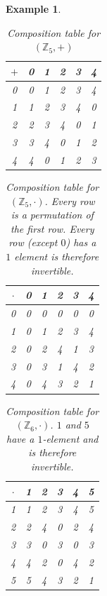 \documentclass[a4paper,landscape,twocolumn]{article}
\newtheorem{ex}{Example}[section]
\begin{document}
\begin{ex}
  \begin{table}[!ht]
    \begin{center}
      \begin{tabular}{c|ccccc}
        $+$ & 0 & 1 & 2 & 3 & 4 \\
      \hline
          0 & 0 & 1 & 2 & 3 & 4 \\
          1 & 1 & 2 & 3 & 4 & 0 \\
          2 & 2 & 3 & 4 & 0 & 1 \\
          3 & 3 & 4 & 0 & 1 & 2 \\
          4 & 4 & 0 & 1 & 2 & 3
      \end{tabular}
      \caption{Composition table for $(\mathbb{Z}_5, +)$}
    \end{center}
  \end{table}
  \begin{table}[!ht]
    \begin{center}
      \begin{tabular}{c|ccccc}
        $\cdot$ & 0 & 1 & 2 & 3 & 4 \\
      \hline
              0 & 0 & 0 & 0 & 0 & 0 \\
              1 & 0 & 1 & 2 & 3 & 4 \\
              2 & 0 & 2 & 4 & 1 & 3 \\
              3 & 0 & 3 & 1 & 4 & 2 \\
              4 & 0 & 4 & 3 & 2 & 1
      \end{tabular}
      \caption{
        Composition table for $(\mathbb{Z}_5, \cdot)$.
        Every row is a permutation of the first row.
        Every row (except $0$) has a $1$ element is therefore invertible.
      }
    \end{center}
  \end{table}
  \begin{table}[!ht]
    \begin{center}
      \begin{tabular}{c|ccccc}
        $\cdot$ & 1 & 2 & 3 & 4 & 5 \\
      \hline
              1 & 1 & 2 & 3 & 4 & 5 \\
              2 & 2 & 4 & 0 & 2 & 4 \\
              3 & 3 & 0 & 3 & 0 & 3 \\
              4 & 4 & 2 & 0 & 4 & 2 \\
              5 & 5 & 4 & 3 & 2 & 1
      \end{tabular}
      \caption{
        Composition table for $(\mathbb{Z}_6, \cdot)$.
        $1$ and $5$ have a $1$-element and is therefore invertible.
      }
    \end{center}
  \end{table}


\end{ex}
\end{document}
